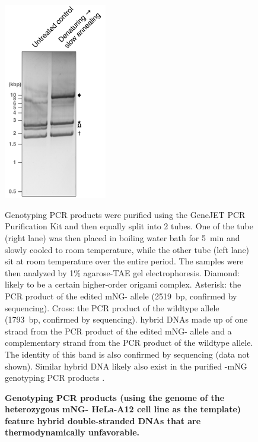 \begin{figure}
    \centering
    \includegraphics[width=0.4\textwidth]{chapters/figures/HybridGenotypingdsDNA.pdf}
    \caption{\textbf{Genotyping PCR products (using the genome of the heterozygous mNG- HeLa-A12 cell line as the template) feature hybrid double-stranded DNAs that are thermodynamically unfavorable.}}
    Genotyping PCR products were purified using the GeneJET PCR Purification Kit and then equally split into 2 tubes. One of the tube (right lane) was then placed in boiling water bath for \SI{5}{min} and slowly cooled to room temperature, while the other tube (left lane) sit at room temperature over the entire period. The samples were then analyzed by 1\% agarose-TAE gel electrophoresis. Diamond: likely to be a certain higher-order origami complex. Asterisk: the PCR product of the edited mNG- allele (\SI{2519}{bp}, confirmed by sequencing). Cross: the PCR product of the wildtype  allele (\SI{1793}{bp}, confirmed by sequencing). \underline{\textOmega{}} hybrid DNAs made up of one strand from the PCR product of the edited mNG- allele and a complementary strand from the PCR product of the wildtype  allele. The identity of this band is also confirmed by sequencing (data not shown). Similar hybrid DNA likely also exist in the purified -mNG genotyping PCR products .
    \label{HybridGenotypingdsDNA}
\end{figure}








